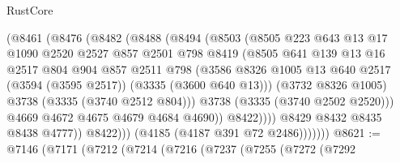 \begin{lexlean}{RustCore}
\begin{coremodule}
                        (@8461
                          (@8476
                            (@8482
                              (@8488
                                (@8494
                                  (@8503
                                    (@8505
                                      @223
                                      @643
                                      @13
                                      @17
                                      @1090
                                      @2520
                                      @2527
                                      @857
                                      @2501
                                      @798
                                      @8419
                                      (@8505
                                        @641
                                        @139
                                        @13
                                        @16
                                        @2517
                                        @804
                                        @904
                                        @857
                                        @2511
                                        @798
                                        (@3586
                                          @8326
                                          @1005
                                          @13
                                          @640
                                          @2517
                                          (@3594 (@3595 @2517))
                                          (@3335 (@3600 @640 @13)))
                                        (@3732 @8326 @1005)
                                        @3738
                                        (@3335 (@3740 @2512 @804)))
                                      @3738
                                      (@3335 (@3740 @2502 @2520)))
                                    @4669
                                    @4672
                                    @4675
                                    @4679
                                    @4684
                                    @4690))
                                @8422))))
                        @8429
                        @8432
                        @8435
                        @8438
                        @4777))
                    @8422)))
              (@4185 (@4187 @391 @72 @2486)))))))
@8621 := @7146
    (@7171
      (@7212
        (@7214
          (@7216
            (@7237
              (@7255
                (@7272
                  (@7292

\end{coremodule}
\end{lexlean}
